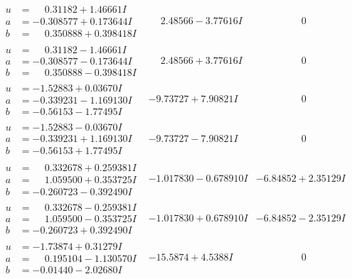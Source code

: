 \documentclass[1p]{elsarticle_modified}
\theoremstyle{definition}
\begin{document}
$$\begin{array}{c|c|c}
\begin{aligned}
u &= \phantom{-}0.31182 + 1.46661 I \\
a &= -0.308577 + 0.173644 I \\
b &= \phantom{-}0.350888 + 0.398418 I\end{aligned}
 & \phantom{-}2.48566 - 3.77616 I & \phantom{-0.000000 } 0 \\ \hline\begin{aligned}
u &= \phantom{-}0.31182 - 1.46661 I \\
a &= -0.308577 - 0.173644 I \\
b &= \phantom{-}0.350888 - 0.398418 I\end{aligned}
 & \phantom{-}2.48566 + 3.77616 I & \phantom{-0.000000 } 0 \\ \hline\begin{aligned}
u &= -1.52883 + 0.03670 I \\
a &= -0.339231 - 1.169130 I \\
b &= -0.56153 - 1.77495 I\end{aligned}
 & -9.73727 + 7.90821 I & \phantom{-0.000000 } 0 \\ \hline\begin{aligned}
u &= -1.52883 - 0.03670 I \\
a &= -0.339231 + 1.169130 I \\
b &= -0.56153 + 1.77495 I\end{aligned}
 & -9.73727 - 7.90821 I & \phantom{-0.000000 } 0 \\ \hline\begin{aligned}
u &= \phantom{-}0.332678 + 0.259381 I \\
a &= \phantom{-}1.059500 + 0.353725 I \\
b &= -0.260723 - 0.392490 I\end{aligned}
 & -1.017830 - 0.678910 I & -6.84852 + 2.35129 I \\ \hline\begin{aligned}
u &= \phantom{-}0.332678 - 0.259381 I \\
a &= \phantom{-}1.059500 - 0.353725 I \\
b &= -0.260723 + 0.392490 I\end{aligned}
 & -1.017830 + 0.678910 I & -6.84852 - 2.35129 I \\ \hline\begin{aligned}
u &= -1.73874 + 0.31279 I \\
a &= \phantom{-}0.195104 - 1.130570 I \\
b &= -0.01440 - 2.02680 I\end{aligned}
 & -15.5874 + 4.5388 I & \phantom{-0.000000 } 0 \\ \hline\begin{aligned}

\end{aligned}
\end{array}$$
\end{document}
